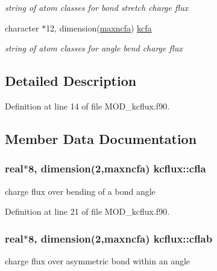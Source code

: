 \begin{DoxyCompactItemize}
\begin{DoxyCompactList}\small\item\em string of atom classes for bond stretch charge flux \end{DoxyCompactList}\item 
character $\ast$12, dimension(\hyperlink{classkcflux_aed5026e7c442e2d8adc07418913e4b23}{maxncfa}) \hyperlink{classkcflux_ae44315660c09ff5741e75037d0a29ee1}{kcfa}
\begin{DoxyCompactList}\small\item\em string of atom classes for angle bend charge flux \end{DoxyCompactList}\end{DoxyCompactItemize}


\subsection{Detailed Description}


Definition at line 14 of file M\-O\-D\-\_\-kcflux.\-f90.



\subsection{Member Data Documentation}
\hypertarget{classkcflux_a067a33e9e311bc7aa28ba929ba7b4798}{
\subsubsection[{cfla}]{\setlength{\rightskip}{0pt plus 5cm}real$\ast$8, dimension(2,{\bf maxncfa}) kcflux\-::cfla}}\label{classkcflux_a067a33e9e311bc7aa28ba929ba7b4798}


charge flux over bending of a bond angle 



Definition at line 21 of file M\-O\-D\-\_\-kcflux.\-f90.

\hypertarget{classkcflux_ad9c316648b712054ed06b3a6e5b4fbd9}{
\subsubsection[{cflab}]{\setlength{\rightskip}{0pt plus 5cm}real$\ast$8, dimension(2,{\bf maxncfa}) kcflux\-::cflab}}\label{classkcflux_ad9c316648b712054ed06b3a6e5b4fbd9}


charge flux over asymmetric bond within an angle 



